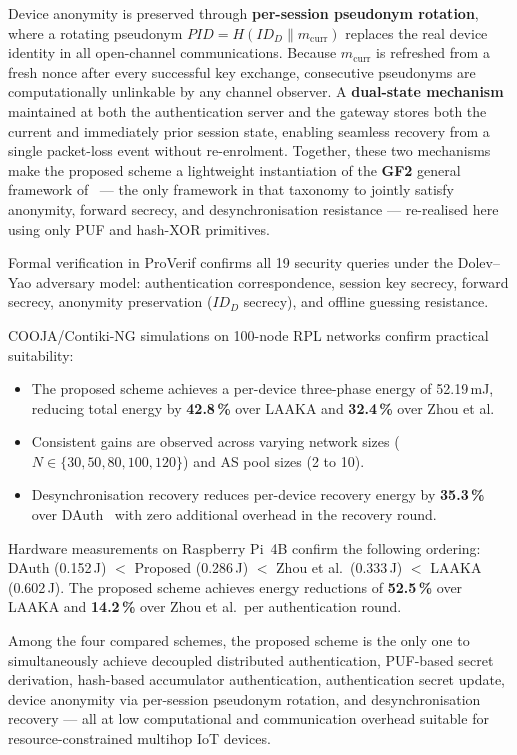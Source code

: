 \documentclass[12pt,a4paper]{report}
\begin{document}
Device anonymity is preserved through \textbf{per-session pseudonym rotation}, where
a rotating pseudonym $\mathit{PID} = H(ID_D \| m_{\mathrm{curr}})$ replaces the
real device identity in all open-channel communications.
Because $m_{\mathrm{curr}}$ is refreshed from a fresh nonce after every successful
key exchange, consecutive pseudonyms are computationally unlinkable by any channel
observer.
A \textbf{dual-state mechanism} maintained at both the authentication server and the
gateway stores both the current and immediately prior session state, enabling seamless
recovery from a single packet-loss event without re-enrolment.
Together, these two mechanisms make the proposed scheme a lightweight instantiation
of the \textbf{GF2} general framework of~\cite{zhong2025survey} — the only framework
in that taxonomy to jointly satisfy anonymity, forward secrecy, and desynchronisation
resistance — re-realised here using only PUF and hash-XOR primitives.

Formal verification in ProVerif confirms all 19 security queries under the Dolev--Yao
adversary model: authentication correspondence, session key secrecy, forward secrecy,
anonymity preservation ($ID_D$ secrecy), and offline guessing resistance.

COOJA/Contiki-NG simulations on 100-node RPL networks confirm practical suitability:
\begin{itemize}
  \item The proposed scheme achieves a per-device three-phase energy of 52.19\,mJ,
    reducing total energy by \textbf{42.8\,\%} over LAAKA and \textbf{32.4\,\%}
    over Zhou et al.
  \item Consistent gains are observed across varying network sizes
    ($N \in \{30, 50, 80, 100, 120\}$) and AS pool sizes (2 to 10).
  \item Desynchronisation recovery reduces per-device recovery energy by
    \textbf{35.3\,\%} over DAuth~\cite{das2026comsnets} with zero additional
    overhead in the recovery round.
\end{itemize}

Hardware measurements on Raspberry Pi~4B confirm the following ordering:
DAuth (0.152\,J) $<$ Proposed (0.286\,J) $<$ Zhou et al.\ (0.333\,J) $<$ LAAKA (0.602\,J).
The proposed scheme achieves energy reductions of \textbf{52.5\,\%} over LAAKA and
\textbf{14.2\,\%} over Zhou et al.\ per authentication round.

Among the four compared schemes, the proposed scheme is the only one to simultaneously
achieve decoupled distributed authentication, PUF-based secret derivation, hash-based
accumulator authentication, authentication secret update, device anonymity via
per-session pseudonym rotation, and desynchronisation recovery — all at low
computational and communication overhead suitable for resource-constrained multihop
IoT devices.



\end{document}
